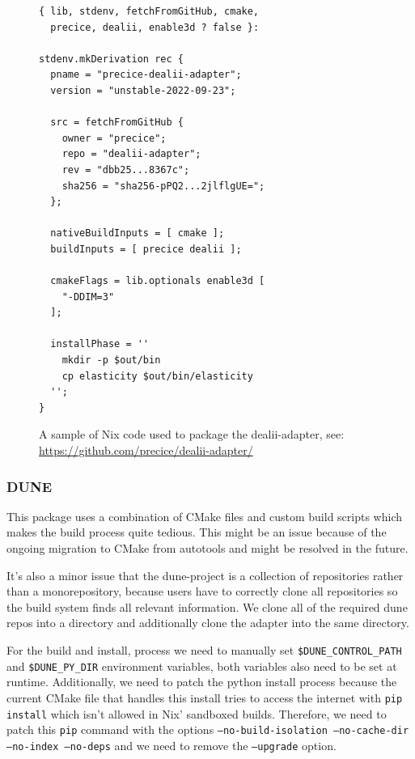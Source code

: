 \documentclass[conference,final,a4paper]{IEEEtran}
\begin{document}
\begin{figure}
    \begin{multicols}{2}
    \normalsize
    \begin{verbatim}
{ lib, stdenv, fetchFromGitHub, cmake,
  precice, dealii, enable3d ? false }:

stdenv.mkDerivation rec {
  pname = "precice-dealii-adapter";
  version = "unstable-2022-09-23";

  src = fetchFromGitHub {
    owner = "precice";
    repo = "dealii-adapter";
    rev = "dbb25...8367c";
    sha256 = "sha256-pPQ2...2jlflgUE=";
  };

  nativeBuildInputs = [ cmake ];
  buildInputs = [ precice dealii ];

  cmakeFlags = lib.optionals enable3d [
    "-DDIM=3"
  ];

  installPhase = ''
    mkdir -p $out/bin
    cp elasticity $out/bin/elasticity
  '';
}
    \end{verbatim}
    \end{multicols}
    \caption{A sample of Nix code used to package the dealii-adapter, see: \url{https://github.com/precice/dealii-adapter/}}
    \label{lst:dealii-adapter-nix}
    \hrulefill
    \vspace*{4pt}
\end{figure}

\subsubsection{DUNE}

This package uses a combination of CMake files and custom build scripts which makes the build process quite tedious.
This might be an issue because of the ongoing migration to CMake from autotools and might be resolved in the future.

It's also a minor issue that the dune-project is a collection of repositories rather than a monorepository, because users have to correctly clone all repositories so the build system finds all relevant information.
We clone all of the required dune repos into a directory and additionally clone the adapter into the same directory.

For the build and install, process we need to manually set \texttt{\$DUNE\_CONTROL\_PATH} and \texttt{\$DUNE\_PY\_DIR} environment variables, both variables also need to be set at runtime.
Additionally, we need to patch the python install process because the current CMake file that handles this install tries to access the internet with \texttt{pip install} which isn't allowed in Nix' sandboxed builds.
Therefore, we need to patch this \texttt{pip} command with the options \texttt{--no-build-isolation --no-cache-dir --no-index --no-deps} and we need to remove the \texttt{--upgrade} option.\\
\end{document}
